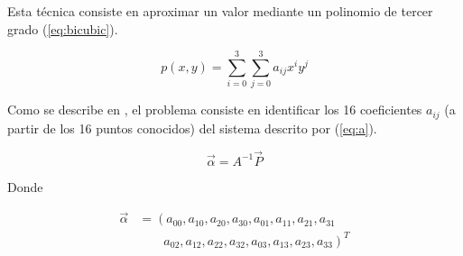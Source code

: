 \documentclass{IEEEtran}
\begin{document}
Esta técnica consiste en aproximar un valor mediante un polinomio de tercer
grado (\ref{eq:bicubic}).

\begin{equation}
p(x,y) = \sum_{i=0}^{3} \sum_{j=0}^{3} a_{ij} x^i y^j
\label{eq:bicubic}
\end{equation} 

Como se describe en \cite{BicubicWiki}, el problema consiste en identificar
los 16 coeficientes $a_{ij}$ (a partir de los 16 puntos conocidos)
del sistema descrito por (\ref{eq:a}).

\begin{equation}
\vec{\alpha} = A^{-1} \vec{P}
\label{eq:a}
\end{equation} 

Donde

\begin{align}
\vec{\alpha}&=\left(a_{00},a_{10},a_{20},a_{30},a_{01},a_{11},a_{21},a_{31}\right.\nonumber\\
    &\qquad \left. a_{02},a_{12},a_{22},a_{32},a_{03},a_{13},a_{23},a_{33}\right)^{T}
\end{align} 
\end{document}
